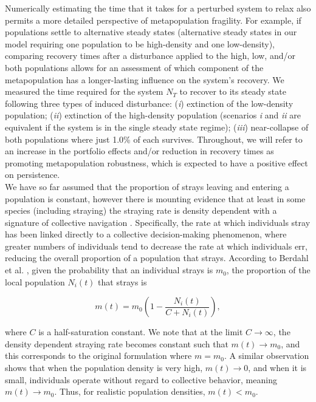\documentclass[twocolumn,preprintnumbers,amsmath,amssymb,superscriptaddress]{revtex4}
\begin{document}
Numerically estimating the time that it takes for a perturbed system to relax also permits a more detailed perspective of metapopulation fragility.
For example, if populations settle to alternative steady states (alternative steady states in our model requiring one population to be high-density and one low-density), comparing recovery times after a disturbance applied to the high, low, and/or both populations allows for an assessment of which component of the metapopulation has a longer-lasting influence on the system's recovery.
We measured the time required for the system $N_T$ to recover to its steady state following three types of induced disturbance: (\emph{i}) extinction of the low-density population; (\emph{ii}) extinction of the high-density population (scenarios \emph{i} and \emph{ii} are equivalent if the system is in the single steady state regime); (\emph{iii}) near-collapse of both populations where just 1.0\% of each survives.
Throughout, we will refer to an increase in the portfolio effects and/or reduction in recovery times as promoting metapopulation robustness, which is expected to have a positive effect on persistence.
\\

\noindent We have so far assumed that the proportion of strays leaving and entering a population is constant, however there is mounting evidence that at least in some species (including straying) the straying rate is density dependent with a signature of collective navigation \cite{Berdahl:2016dx,Bett:2017ha}.
Specifically, the rate at which individuals stray has been linked directly to a collective decision-making phenomenon, where greater numbers of individuals tend to decrease the rate at which individuals err, reducing the overall proportion of a population that strays.
According to Berdahl et al. \cite{Berdahl:2014bl,Berdahl:2016dx}, given the probability that an individual strays is $m_0$, the proportion of the local population $N_i(t)$ that strays is

\begin{equation}
  m(t) = m_0\left(1- \frac{N_i(t)}{C+N_i(t)}\right),
  \label{eq:ddm}
\end{equation}

\noindent where $C$ is a half-saturation constant.
We note that at the limit $C\rightarrow \infty$, the density dependent straying rate becomes constant such that $m(t) \rightarrow m_0$, and this corresponds to the original formulation where $m=m_0$.
A similar observation shows that when the population density is very high, $m(t) \rightarrow 0$, and when it is small, individuals operate without regard to collective behavior, meaning $m(t) \rightarrow m_0$.
Thus, for realistic population densities, $m(t) < m_0$.
\end{document}
